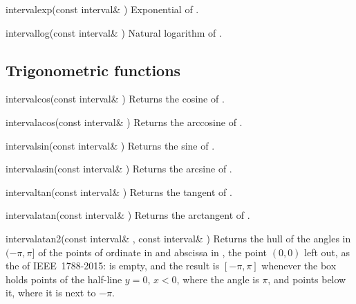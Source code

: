 \documentclass{manual}
\begin{document}
\begin{deffun}{interval}{exp}{(const interval\& )}
  Exponential of .
\end{deffun}

\begin{deffun}{interval}{log}{(const interval\& )}
  Natural logarithm of .
\end{deffun}

\subsection{Trigonometric functions}

\begin{deffun}{interval}{cos}{(const interval\& )}
  Returns the cosine of .
\end{deffun}

\begin{deffun}{interval}{acos}{(const interval\& )}
  Returns the arccosine of .
\end{deffun}

\begin{deffun}{interval}{sin}{(const interval\& )}
  Returns the sine of .
\end{deffun}

\begin{deffun}{interval}{asin}{(const interval\& )}
  Returns the arcsine of .
\end{deffun}

\begin{deffun}{interval}{tan}{(const interval\& )}
  Returns the tangent of .
\end{deffun}

\begin{deffun}{interval}{atan}{(const interval\& )}
  Returns the arctangent of .
\end{deffun}

\begin{deffun}{interval}{atan2}{(const interval\& , const interval\& )}
  Returns the hull of the angles in $(-\pi,\pi]$ of the points of ordinate in  and abscissa
  in , the point $(0,0)$ left out, as the  of IEEE~1788-2015:
   is empty, and the result is $[-\pi,\pi]$ whenever the box holds points of the
  half-line $y=0$, $x<0$, where the angle is $\pi$, and points below it, where it is next to $-\pi$.
\end{deffun}
\end{document}
